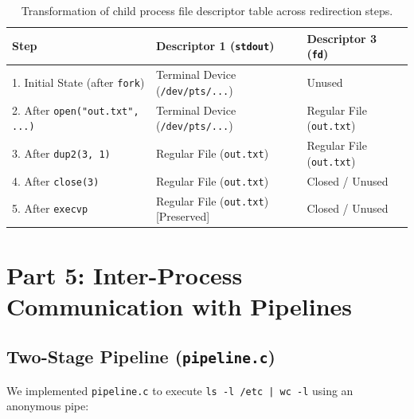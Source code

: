 \documentclass[12pt,a4paper]{article}
\begin{document}
\begin{table}[H]
\centering
\small
\begin{tabularx}{\textwidth}{p{4.2cm}XX}
\toprule
\textbf{Step} & \textbf{Descriptor 1 (\texttt{stdout})} & \textbf{Descriptor 3 (\texttt{fd})} \\
\midrule
1. Initial State (after \texttt{fork}) & Terminal Device (\texttt{/dev/pts/...}) & Unused \\
2. After \texttt{open("out.txt", ...)} & Terminal Device (\texttt{/dev/pts/...}) & Regular File (\texttt{out.txt}) \\
3. After \texttt{dup2(3, 1)} & Regular File (\texttt{out.txt}) & Regular File (\texttt{out.txt}) \\
4. After \texttt{close(3)} & Regular File (\texttt{out.txt}) & Closed / Unused \\
5. After \texttt{execvp} & Regular File (\texttt{out.txt}) [Preserved] & Closed / Unused \\
\bottomrule
\end{tabularx}
\caption{Transformation of child process file descriptor table across redirection steps.}
\label{tab:fdtable}
\end{table}

\newpage

\section{Part 5: Inter-Process Communication with Pipelines}

\subsection{Two-Stage Pipeline (\texttt{pipeline.c})}
We implemented \texttt{pipeline.c} to execute \texttt{ls -l /etc | wc -l} using an anonymous pipe:
\end{document}
